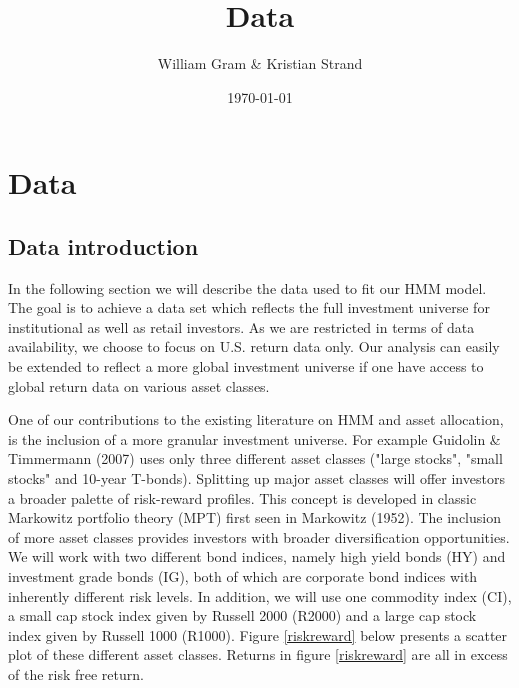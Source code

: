 \documentclass[11pt,a4paper,oneside]{article}
\title{Data}
\author{William Gram \& Kristian Strand}
\date{\today}
\begin{document}
\maketitle

\newpage

\rfoot{\thepage}

\tableofcontents

\newpage

\setcounter{page}{1}

\section{Data}
\subsection{Data introduction}
\noindent In the following section we will describe the data used to fit our HMM model. The goal is to achieve a data set which reflects the full investment universe for institutional as well as retail investors. As we are restricted in terms of data availability, we choose to focus on U.S. return data only. Our analysis can easily be extended to reflect a more global investment universe if one have access to global return data on various asset classes.   

One of our contributions to the existing literature on HMM and asset allocation, is the inclusion of a more granular investment universe. For example Guidolin \& Timmermann (2007) \cite{2007} uses only three different asset classes ("large stocks", "small stocks" and 10-year T-bonds). Splitting up major asset classes will offer investors a broader palette of risk-reward profiles. This concept is developed in classic Markowitz portfolio theory (MPT) first seen in Markowitz (1952)\cite{MPT52}. The inclusion of more asset classes provides investors with broader diversification opportunities. We will work with two different bond indices, namely high yield bonds (HY) and investment grade bonds (IG), both of which are corporate bond indices with inherently different risk levels. In addition, we will use one commodity index (CI), a small cap stock index given by Russell 2000 (R2000) and a large cap stock index given by Russell 1000 (R1000). Figure \ref{riskreward} below presents a scatter plot of these different asset classes. Returns in figure \ref{riskreward} are all in excess of the risk free return.  
\end{document}
